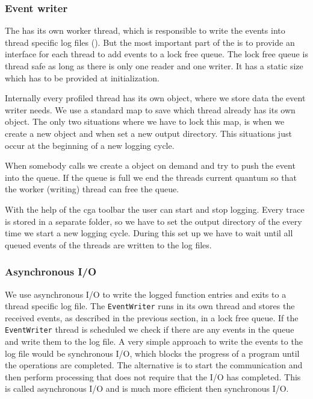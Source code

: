 \subsubsection{Event writer} 

The  has its own worker thread, which is responsible to write the events into thread specific log files (). But the most important part of the  is to provide an interface for each thread to add events to a lock free queue. The lock free queue is thread safe as long as there is only one reader and one writer. It has a static size which has to be provided at initialization.

Internally every profiled thread has its own  object, where we store data the event writer needs. We use a standard map to save which thread already has its own  object. The only two situations where we have to lock this map, is when we create a new  object and when set a new output directory. This situations just occur at the beginning of a new logging cycle.

When somebody calls  we create a  object on demand and try to push the event into the queue. If the queue is full we end the threads current quantum so that the worker (writing) thread can free the queue.

With the help of the cga toolbar the user can start and stop logging. Every trace is stored in a separate folder, so we have to set the output directory of the  every time we start a new logging cycle. During this set up we have to wait until all queued events of the threads are written to the log files.

\subsubsection{Asynchronous I/O}

We use asynchronous I/O to write the logged function entries and exits to a thread specific log file. The \verb=EventWriter= runs in its own thread and stores the received events, as described in the previous section, in a lock free queue. If the \verb=EventWriter= thread is scheduled we check if there are any events in the queue and write them to the log file. A very simple approach to write the events to the log file would be synchronous I/O, which blocks the progress of a program until the operations are completed. The alternative is to start the communication and then perform processing that does not require that the I/O has completed. This is called asynchronous I/O and is much more efficient then synchronous I/O.


